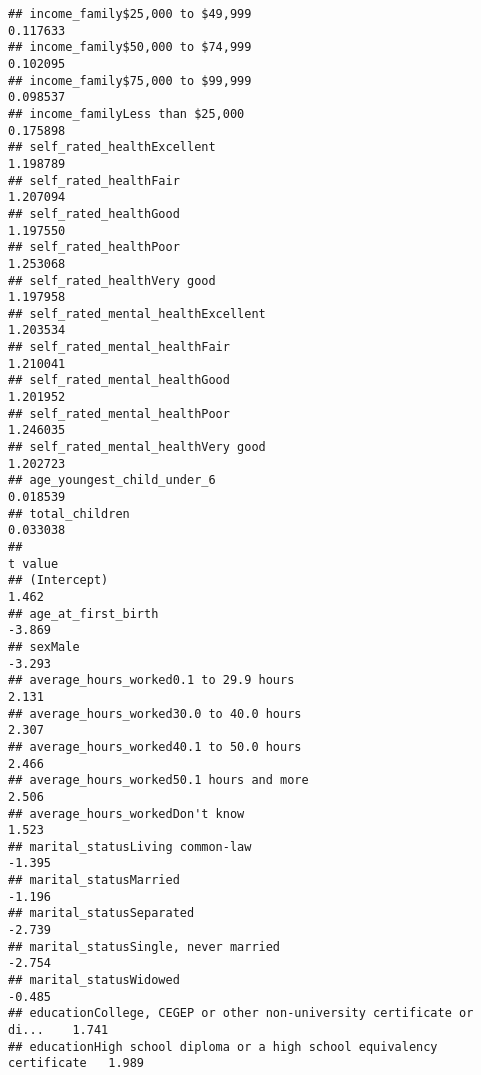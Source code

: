 \documentclass[
]{article}
\begin{document}
\begin{verbatim}
## income_family$25,000 to $49,999                                         0.117633
## income_family$50,000 to $74,999                                         0.102095
## income_family$75,000 to $99,999                                         0.098537
## income_familyLess than $25,000                                          0.175898
## self_rated_healthExcellent                                              1.198789
## self_rated_healthFair                                                   1.207094
## self_rated_healthGood                                                   1.197550
## self_rated_healthPoor                                                   1.253068
## self_rated_healthVery good                                              1.197958
## self_rated_mental_healthExcellent                                       1.203534
## self_rated_mental_healthFair                                            1.210041
## self_rated_mental_healthGood                                            1.201952
## self_rated_mental_healthPoor                                            1.246035
## self_rated_mental_healthVery good                                       1.202723
## age_youngest_child_under_6                                              0.018539
## total_children                                                          0.033038
##                                                                       t value
## (Intercept)                                                             1.462
## age_at_first_birth                                                     -3.869
## sexMale                                                                -3.293
## average_hours_worked0.1 to 29.9 hours                                   2.131
## average_hours_worked30.0 to 40.0 hours                                  2.307
## average_hours_worked40.1 to 50.0 hours                                  2.466
## average_hours_worked50.1 hours and more                                 2.506
## average_hours_workedDon't know                                          1.523
## marital_statusLiving common-law                                        -1.395
## marital_statusMarried                                                  -1.196
## marital_statusSeparated                                                -2.739
## marital_statusSingle, never married                                    -2.754
## marital_statusWidowed                                                  -0.485
## educationCollege, CEGEP or other non-university certificate or di...    1.741
## educationHigh school diploma or a high school equivalency certificate   1.989

\end{verbatim}
\end{document}
